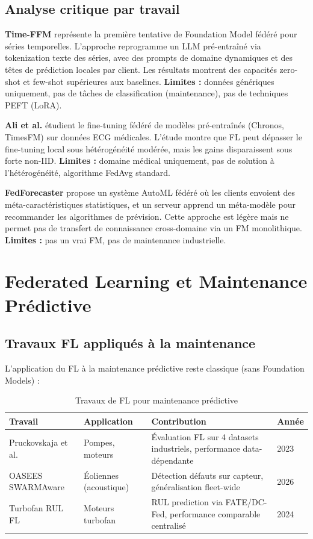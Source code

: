 \documentclass[12pt, a4paper]{report}
\begin{document}
\subsection{Analyse critique par travail}

\textbf{Time-FFM} représente la première tentative de Foundation Model fédéré pour
séries temporelles. L'approche reprogramme un LLM pré-entraîné via tokenization texte
des séries, avec des prompts de domaine dynamiques et des têtes de prédiction locales
par client. Les résultats montrent des capacités zero-shot et few-shot supérieures aux
baselines. \textbf{Limites :} données génériques uniquement, pas de tâches de
classification (maintenance), pas de techniques PEFT (LoRA).

\textbf{Ali et al.} étudient le fine-tuning fédéré de modèles pré-entraînés (Chronos,
TimesFM) sur données ECG médicales. L'étude montre que FL peut dépasser le fine-tuning
local sous hétérogénéité modérée, mais les gains disparaissent sous forte non-IID.
\textbf{Limites :} domaine médical uniquement, pas de solution à l'hétérogénéité,
algorithme FedAvg standard.

\textbf{FedForecaster} propose un système AutoML fédéré où les clients envoient des
méta-caractéristiques statistiques, et un serveur apprend un méta-modèle pour
recommander les algorithmes de prévision. Cette approche est légère mais ne permet
pas de transfert de connaissance cross-domaine via un FM monolithique. \textbf{Limites :}
pas un vrai FM, pas de maintenance industrielle.

\section{Federated Learning et Maintenance Prédictive}

\subsection{Travaux FL appliqués à la maintenance}

L'application du FL à la maintenance prédictive reste classique (sans Foundation Models) :

\begin{table}[h!]
\centering
\caption{Travaux de FL pour maintenance prédictive}
\label{tab:fl-pm-works}
\renewcommand{\arraystretch}{1.5}
\begin{tabularx}{\textwidth}{p{3.5cm}p{2.5cm}Xl}
\toprule
\textbf{Travail} & \textbf{Application} & \textbf{Contribution} & \textbf{Année} \\
\midrule
Pruckovskaja et al. & Pompes, moteurs & Évaluation FL sur 4 datasets industriels, performance data-dépendante & 2023 \\
OASEES SWARMAware & Éoliennes (acoustique) & Détection défauts sur capteur, généralisation fleet-wide & 2026 \\
Turbofan RUL FL & Moteurs turbofan & RUL prediction via FATE/DC-Fed, performance comparable centralisé & 2024 \\
\bottomrule
\end{tabularx}
\end{table}
\end{document}
